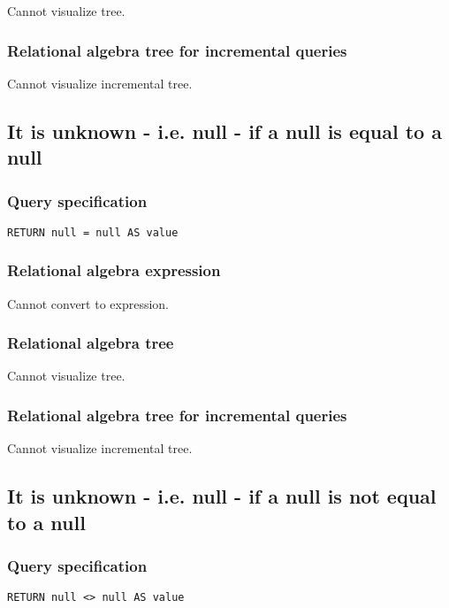 Cannot visualize tree.

\subsubsection*{Relational algebra tree for incremental queries}

Cannot visualize incremental tree.

\subsection{It is unknown - i.e. null - if a null is equal to a null}

\subsubsection*{Query specification}

\begin{lstlisting}
RETURN null = null AS value
\end{lstlisting}

\subsubsection*{Relational algebra expression}

Cannot convert to expression.

\subsubsection*{Relational algebra tree}

Cannot visualize tree.

\subsubsection*{Relational algebra tree for incremental queries}

Cannot visualize incremental tree.

\subsection{It is unknown - i.e. null - if a null is not equal to a null}

\subsubsection*{Query specification}

\begin{lstlisting}
RETURN null <> null AS value
\end{lstlisting}

